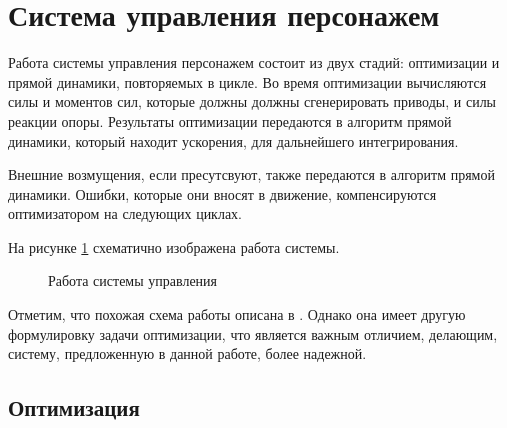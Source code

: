 \section{Система управления персонажем}

Работа системы управления персонажем состоит из двух стадий: оптимизации и прямой динамики, повторяемых в цикле. Во время оптимизации вычисляются силы и моментов сил, которые должны должны сгенерировать приводы, и силы реакции опоры. Результаты оптимизации передаются в алгоритм прямой динамики, который находит ускорения, для дальнейшего интегрирования.

Внешние возмущения, если пресутсвуют, также передаются в алгоритм прямой динамики. Ошибки, которые они вносят в движение, компенсируются оптимизатором на следующих циклах.

На рисунке \ref{fig:architecture} схематично изображена работа системы.

\begin{figure}[h]
  \begin{minipage}{\textwidth}
    \centering
    \caption{Работа системы управления}
    \label{fig:architecture}
  \end{minipage}
\end{figure}

Отметим, что похожая схема работы описана в \cite{AbeSP}. Однако она имеет другую формулировку задачи оптимизации, что является важным отличием, делающим, систему, предложенную в данной работе, более надежной.

\subsection{Оптимизация}


